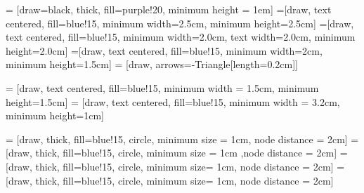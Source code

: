 
 = [draw=black, thick, fill=purple!20, minimum height = 1em]
 =[draw, text centered, fill=blue!15, minimum width=2.5cm, minimum height=2.5cm]
 =[draw, text centered, fill=blue!15, minimum width=2.0cm, text width=2.0cm, minimum height=2.0cm]
 =[draw, text centered, fill=blue!15, minimum width=2cm, minimum height=1.5cm]
 = [draw, arrows={-Triangle[length=0.2cm]}]

 = [draw, text centered, fill=blue!15, minimum width = 1.5cm,
minimum height=1.5cm]
 = [draw, text centered, fill=blue!15, minimum width = 3.2cm,
minimum height=1cm]

 = [draw, thick, fill=blue!15, circle, minimum size = 1cm, node distance = 2cm]
 = [draw, thick, fill=blue!15, circle, minimum size = 1cm ,node distance = 2cm]
 = [draw, thick, fill=blue!15, circle, minimum size= 1cm, node distance = 2cm]
 = [draw, thick, fill=blue!15, circle, minimum size= 1cm, node distance = 2cm]


